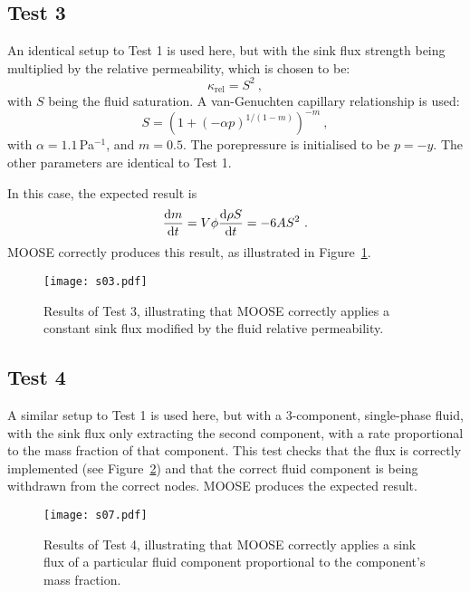 \subsection{Test 3}

An identical setup to Test 1 is used here, but with the sink flux
strength being multiplied by the relative permeability, which is
chosen to be:
\begin{equation}
\kappa_{\mathrm{rel}} = S^{2} \ ,
\end{equation}
with $S$ being the fluid saturation.  A van-Genuchten capillary
relationship is used:
\begin{equation}
S = \left( 1 + (-\alpha p)^{1/(1-m)} \right)^{-m} \ ,
\end{equation}
with $\alpha = 1.1$\,Pa$^{-1}$, and $m=0.5$.  The porepressure is
initialised to be $p=-y$.  The other parameters are
identical to Test 1.

In this case, the expected result is
\begin{equation}
\frac{\mathrm{d} m}{\mathrm{d} t} = V\phi \frac{\mathrm{d} \rho S}{\mathrm{d} t} = -6 A S^{2} \ .
\end{equation}
MOOSE correctly produces this result, as illustrated in
Figure~\ref{s03.fig}.

\begin{figure}[htb]
\begin{center}
\texttt{[image: s03.pdf]}
\caption{Results of Test 3, illustrating that MOOSE correctly applies
  a constant sink flux modified by the fluid relative permeability.}
\label{s03.fig}
\end{center}
\end{figure}


\subsection{Test 4}

A similar setup to Test 1 is used here, but with a 3-component,
single-phase fluid, with the sink flux only extracting the second
component, with a rate proportional to the mass fraction of that
component.  This test checks that the flux is correctly implemented
(see Figure~\ref{s07.fig}) and that the correct fluid component is being
withdrawn from the correct nodes.  MOOSE produces the expected result.

\begin{figure}[htb]
\begin{center}
\texttt{[image: s07.pdf]}
\caption{Results of Test 4, illustrating that MOOSE correctly applies
  a sink flux of a particular fluid component proportional to the
  component's mass fraction.}
\label{s07.fig}
\end{center}
\end{figure}


